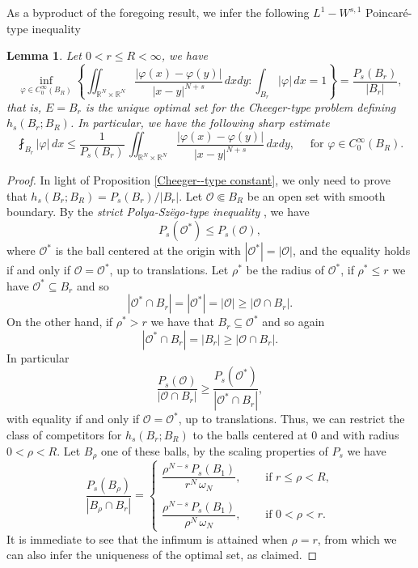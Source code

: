 \documentclass{amsart}
\newtheorem{lemma}[theorem]{Lemma}
\theoremstyle{definition}
\numberwithin{equation}{section}
\begin{document}
\newpage
As a byproduct of the foregoing result, we infer the following $L^1-W^{s,1}$ Poincar\'e-type inequality 

\begin{lemma} \label{poincarè-Palle} 
	Let $0 < r \le R < \infty$, we have \[
	\inf_{\varphi \in C^\infty_0(B_R)}\left\{\iint_{\mathbb{R}^N \times \mathbb{R}^N} \frac{|\varphi(x) - \varphi(y)|}{|x-y|^{N + s}}\,dxdy : \int_{B_r} |\varphi|\,dx = 1\right\} = \frac{P_s(B_r)}{|B_r|},
	\]
	that is, $E = B_r$ is the unique optimal set for the Cheeger-type problem defining $h_s\left(B_r; B_R\right)$. In particular, we have the following sharp estimate
	\begin{equation}
		\fint_{B_r} |\varphi|\,dx \le \frac{1}{P_s(B_r)}\,\iint_{\mathbb{R}^N \times \mathbb{R}^N} \frac{|\varphi(x) - \varphi(y)|}{|x-y|^{N + s}}\,dxdy, \quad \mbox{ for } \varphi \in C^\infty_0(B_R). 
	\end{equation}
\end{lemma}
\begin{proof}
	In light of Proposition \ref{Cheeger--type constant}, we only need to prove that $h_s\left(B_r; B_R\right) = P_s(B_r)/|B_r|.$
	Let $\mathcal{O} \Subset B_R$ be an open set with smooth boundary.  By the {\it strict Polya-Sz\"ego-type inequality} \cite[Theorem A.1]{FS}, we have \[ 
	P_s(\mathcal{O}^*)\le P_s(\mathcal{O}),
	\] 
	where $\mathcal{O}^*$ is the ball centered at the origin with $|\mathcal{O}^*|=|\mathcal{O}|$, and the equality holds if and only if $\mathcal{O} = \mathcal{O}^*$, up to translations. Let $\rho^*$ be the radius of $\mathcal{O}^*$, if $\rho^* \leq r$ we have $\mathcal{O}^* \subseteq B_r$ and so \[
	|\mathcal{O}^* \cap B_r| = |\mathcal{O}^*| = |\mathcal{O}| \geq |\mathcal{O} \cap B_r|.
	\]
	On the other hand, if $\rho^* > r$ we have that $B_r \subseteq \mathcal{O}^*$ and so again \[
	|\mathcal{O}^* \cap B_r| = |B_r| \geq |\mathcal{O} \cap B_r|.
	\]
	In particular \[
	\dfrac{P_s(\mathcal{O})}{|\mathcal{O} \cap B_r|} \geq \dfrac{P_s(\mathcal{O}^*)}{|\mathcal{O}^* \cap B_r|},
	\]
	with equality if and only if $\mathcal{O} = \mathcal{O}^*$, up to translations. 
	Thus, we can restrict the class of competitors for $h_s\left(B_r; B_R\right)$ to the balls centered at $0$ and with radius $0 < \rho < R$. Let $B_\rho$ one of these balls, by the scaling properties of $P_s$ we have 
	\[
	\dfrac{P_s\left({B}_\rho\right)}{\left|B_\rho \cap B_{r}\right|}=
	\begin{cases}
		\dfrac{\rho^{N-s}\,P_s\left(B_1\right)}{r^N\,\omega_N}, \quad &\mbox{ if } r \leq \rho < R, \\ 
		\\
		\dfrac{\rho^{N-s}\,P_s\left(B_1\right)}{\rho^N\,\omega_N}, \quad &\mbox{ if } 0 < \rho < r.
	\end{cases}
	\]
	It is immediate to see that the infimum is attained when $\rho=r$, from which we can also infer the uniqueness of the optimal set, as claimed.
\end{proof}	
\end{document}
